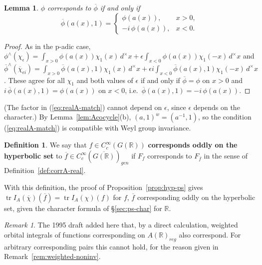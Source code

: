 \documentclass[12pt,letterpaper]{book}
\theoremstyle{plain}
\newtheorem{lemma}[theorem]{Lemma}
\theoremstyle{definition}
\newtheorem{definition}[theorem]{Definition}
\theoremstyle{remark}
\newtheorem{remark}[theorem]{Remark}
\theoremstyle{remark}
\newcommand{\tr}{\operatorname{tr}}
\begin{document}
\begin{lemma}\label{lem:realA-match}
$\phi$ corresponds to $\overline{\phi}$ if and only if
\begin{equation}\label{eq:realA-match}
\overline{\phi}(a(x),1)=
\left\{
\begin{array}{ll}
\phi(a(x)), & x>0,\\
-i\,\phi(a(x)), & x<0.
\end{array}
\right.
\end{equation}
\end{lemma}

\begin{proof}
As in the p-adic case,
$\phi^\wedge(\chi_\epsilon)=\int_{x>0}\phi(a(x))\chi_1(x)\,d^\times x
+\epsilon\int_{x<0}\phi(a(x))\chi_1(-x)\,d^\times x$ and
$\overline{\phi}^\wedge(\overline{\chi}_{\epsilon i})
=\int_{x>0}\overline{\phi}(a(x),1)\chi_1(x)\,d^\times x
+\epsilon i\int_{x<0}\overline{\phi}(a(x),1)\chi_1(-x)\,d^\times x$.
These agree for all $\chi_1$ and both values of $\epsilon$ if and only if
$\overline{\phi}=\phi$ on $x>0$ and $i\,\overline{\phi}(a(x),1)=\phi(a(x))$
on $x<0$, i.e.\ $\overline{\phi}(a(x),1)=-i\,\phi(a(x))$.
\end{proof}

(The factor in (\ref{eq:realA-match}) cannot depend on $\epsilon$, since
$\epsilon$ depends on the character.) By Lemma~\ref{lem:Acocycle}(b), $(a,1)^w=(a^{-1},1)$, so the
condition (\ref{eq:realA-match}) is compatible with Weyl group
invariance.

\begin{definition} We say that
$f \in C_c^\infty(G({\mathbb R}))$ {\bf corresponds oddly on the
hyperbolic set} to
$\overline{f}\in C_c^\infty(\overline{G({\mathbb R})})_{gen}$
if $F_f$ corresponds to
$F_{\overline{f}}$
in the sense of Definition~\ref{def:corrA-real}.
\end{definition}

With this definition, the proof of Proposition~\ref{prop:hyp-ps} gives
$\tr I_A(\overline{\chi})(\overline{f})=\tr I_A(\chi)(f)$ for
$f$, $\overline{f}$ corresponding oddly on the hyperbolic set, given the
character formula of \S\ref{sec:ps-char} for ${\mathbb R}$.

\begin{remark}
The 1995 draft added here that, by a direct calculation, weighted
orbital integrals of functions corresponding on
$A({\mathbb{R}})_{reg}$ also correspond. For arbitrary corresponding
pairs this cannot hold, for the reason given in
Remark~\ref{rem:weighted-noninv}.
\end{remark}
\end{document}
